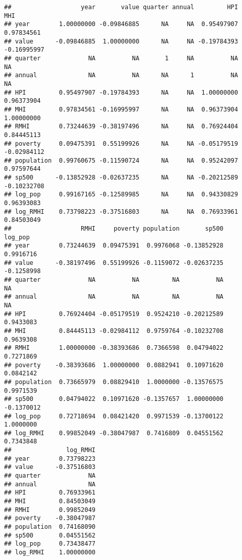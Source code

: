 \documentclass[
]{article}
\newenvironment{Shaded}{\begin{snugshade}}{\end{snugshade}}
\newcommand{\DataTypeTok}[1]{\textcolor[rgb]{0.13,0.29,0.53}{#1}}
\newcommand{\DecValTok}[1]{\textcolor[rgb]{0.00,0.00,0.81}{#1}}
\newcommand{\KeywordTok}[1]{\textcolor[rgb]{0.13,0.29,0.53}{\textbf{#1}}}
\newcommand{\NormalTok}[1]{#1}
\newcommand{\OperatorTok}[1]{\textcolor[rgb]{0.81,0.36,0.00}{\textbf{#1}}}
\newcommand{\StringTok}[1]{\textcolor[rgb]{0.31,0.60,0.02}{#1}}
\begin{document}
\begin{verbatim}
##                   year       value quarter annual         HPI         MHI
## year        1.00000000 -0.09846885      NA     NA  0.95497907  0.97834561
## value      -0.09846885  1.00000000      NA     NA -0.19784393 -0.16995997
## quarter             NA          NA       1     NA          NA          NA
## annual              NA          NA      NA      1          NA          NA
## HPI         0.95497907 -0.19784393      NA     NA  1.00000000  0.96373904
## MHI         0.97834561 -0.16995997      NA     NA  0.96373904  1.00000000
## RMHI        0.73244639 -0.38197496      NA     NA  0.76924404  0.84445113
## poverty     0.09475391  0.55199926      NA     NA -0.05179519 -0.02984112
## population  0.99760675 -0.11590724      NA     NA  0.95242097  0.97597644
## sp500      -0.13852928 -0.02637235      NA     NA -0.20212589 -0.10232708
## log_pop     0.99167165 -0.12589985      NA     NA  0.94330829  0.96393083
## log_RMHI    0.73798223 -0.37516803      NA     NA  0.76933961  0.84503049
##                   RMHI     poverty population       sp500    log_pop
## year        0.73244639  0.09475391  0.9976068 -0.13852928  0.9916716
## value      -0.38197496  0.55199926 -0.1159072 -0.02637235 -0.1258998
## quarter             NA          NA         NA          NA         NA
## annual              NA          NA         NA          NA         NA
## HPI         0.76924404 -0.05179519  0.9524210 -0.20212589  0.9433083
## MHI         0.84445113 -0.02984112  0.9759764 -0.10232708  0.9639308
## RMHI        1.00000000 -0.38393686  0.7366598  0.04794022  0.7271869
## poverty    -0.38393686  1.00000000  0.0882941  0.10971620  0.0842142
## population  0.73665979  0.08829410  1.0000000 -0.13576575  0.9971539
## sp500       0.04794022  0.10971620 -0.1357657  1.00000000 -0.1370012
## log_pop     0.72718694  0.08421420  0.9971539 -0.13700122  1.0000000
## log_RMHI    0.99852049 -0.38047987  0.7416809  0.04551562  0.7343848
##               log_RMHI
## year        0.73798223
## value      -0.37516803
## quarter             NA
## annual              NA
## HPI         0.76933961
## MHI         0.84503049
## RMHI        0.99852049
## poverty    -0.38047987
## population  0.74168090
## sp500       0.04551562
## log_pop     0.73438477
## log_RMHI    1.00000000
\end{verbatim}

\begin{Shaded}
\end{Shaded}
\end{document}
